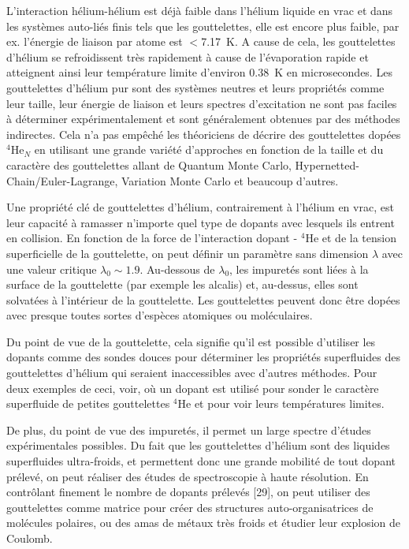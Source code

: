 		L'interaction hélium-hélium est déjà faible dans l'hélium liquide en vrac et dans les systèmes auto-liés finis tels que les gouttelettes, elle est encore plus faible, par ex. l'énergie de liaison par atome est $<$7.17~K. A cause de cela, les gouttelettes d'hélium se refroidissent très rapidement à cause de l'évaporation rapide et atteignent ainsi leur température limite d'environ 0.38~K en microsecondes. Les gouttelettes d'hélium pur sont des systèmes neutres et leurs propriétés comme leur taille, leur énergie de liaison et leurs spectres d'excitation ne sont pas faciles à déterminer expérimentalement et sont généralement obtenues par des méthodes indirectes. Cela n'a pas empêché les théoriciens de décrire des gouttelettes dopées $^4$He$_N$ en utilisant une grande variété d'approches en fonction de la taille et du caractère des gouttelettes allant de Quantum Monte Carlo, Hypernetted-Chain/Euler-Lagrange\citep{Krotscheck2001}, Variation Monte Carlo\citep{Gartner2018} et beaucoup d'autres.

		Une propriété clé de gouttelettes d'hélium, contrairement à l'hélium en vrac, est leur capacité à ramasser n'importe quel type de dopants avec lesquels ils entrent en collision. En fonction de la force de l'interaction dopant - $^4$He et de la tension superficielle de la gouttelette, on peut définir un paramètre sans dimension $\lambda$\citep{Anc95} avec une valeur critique $\lambda_0\sim 1.9$. Au-dessous de $\lambda_0$, les impuretés sont liées à la surface de la gouttelette (par exemple les alcalis) et, au-dessus, elles sont solvatées à l'intérieur de la gouttelette. Les gouttelettes peuvent donc être dopées avec presque toutes sortes d'espèces atomiques ou moléculaires.

		Du point de vue de la gouttelette, cela signifie qu'il est possible d'utiliser les dopants comme des sondes douces pour déterminer les propriétés superfluides des gouttelettes d'hélium qui seraient inaccessibles avec d'autres méthodes. Pour deux exemples de ceci, voir, où un dopant est utilisé pour sonder le caractère superfluide de petites gouttelettes $^4$He et pour voir leurs températures limites.
		
		De plus, du point de vue des impuretés, il permet un large spectre d'études expérimentales possibles. Du fait que les gouttelettes d'hélium sont des liquides superfluides ultra-froids, et permettent donc une grande mobilité de tout dopant prélevé, on peut réaliser des études de spectroscopie à haute résolution. En contrôlant finement le nombre de dopants prélevés [29], on peut utiliser des gouttelettes comme matrice pour créer des structures auto-organisatrices de molécules polaires, ou des amas de métaux très froids et étudier leur explosion de Coulomb.

